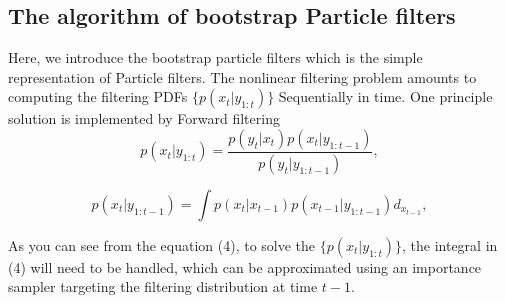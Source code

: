 \documentclass[11pt,oneside,a4paper]{article}
\begin{document}
\subsection{The algorithm of bootstrap Particle filters}

Here, we introduce the bootstrap particle filters which is the simple representation of Particle filters.
The nonlinear filtering problem amounts to computing the filtering PDFs $ \{ p(x_t|y_{1:t}) \}$ Sequentially in time.
One principle solution is implemented by Forward filtering
\begin{equation}

p(x_t | y_{1:t}) = \frac{p(y_t|x_t)p(x_t|y_{1:t-1})}{p(y_t|y_{1:t-1})},

\end{equation}

\begin{equation}
p(x_t | y_{1:t-1}) = \int p(x_t|x_{t-1})p(x_{t-1}|y_{1:t-1}) d_{x_{t-1}},
\end{equation}

As you can see from the equation (4), to solve the $ \{ p(x_t|y_{1:t}) \}$, the integral in (4) will need to be handled, which can be approximated using an importance sampler
targeting the filtering distribution at time $t-1$.
\end{document}

